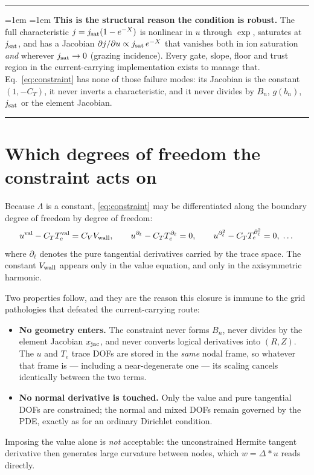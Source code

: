\documentclass[11pt,a4paper]{article}
\newenvironment{keybox}{\par\medskip\noindent\rule{\linewidth}{0.4pt}\par\smallskip%
\leftskip=1em \rightskip=1em\relax}{\par\smallskip\leftskip=0pt \rightskip=0pt\noindent\rule{\linewidth}{0.4pt}\par\medskip}
\begin{document}
\begin{keybox}
\textbf{This is the structural reason the condition is robust.} The full characteristic
$j=j_{\rm sat}(1-e^{-X})$ is nonlinear in $u$ through $\exp$, saturates at $j_{\rm sat}$, and has a
Jacobian $\partial j/\partial u\propto j_{\rm sat}\,e^{-X}$ that vanishes both in ion saturation
\emph{and} wherever $j_{\rm sat}\to0$ (grazing incidence). Every gate, slope, floor and trust region
in the current-carrying implementation exists to manage that. Eq.~\eqref{eq:constraint} has none of
those failure modes: its Jacobian is the constant $(1,-C_T)$, it never inverts a characteristic, and
it never divides by $B_n$, $g(b_n)$, $j_{\rm sat}$ or the element Jacobian.
\end{keybox}

\section{Which degrees of freedom the constraint acts on}

Because $\Lambda$ is a constant, \eqref{eq:constraint} may be differentiated along the boundary
degree of freedom by degree of freedom:
\begin{equation}
  u^{\rm val}-C_TT_e^{\rm val}=C_VV_{\rm wall},
  \qquad
  u^{\partial_\ell}-C_TT_e^{\partial_\ell}=0,
  \qquad
  u^{\partial_\ell^2}-C_TT_e^{\partial_\ell^2}=0,\;\dots
\end{equation}
where $\partial_\ell$ denotes the pure tangential derivatives carried by the trace space. The
constant $V_{\rm wall}$ appears only in the value equation, and only in the axisymmetric harmonic.

Two properties follow, and they are the reason this closure is immune to the grid pathologies that
defeated the current-carrying route:
\begin{itemize}\itemsep2pt
\item \textbf{No geometry enters.} The constraint never forms $B_n$, never divides by the element
      Jacobian $x_{\rm jac}$, and never converts logical derivatives into $(R,Z)$. The $u$ and
      $T_e$ trace DOFs are stored in the \emph{same} nodal frame, so whatever that frame is ---
      including a near-degenerate one --- its scaling cancels identically between the two terms.
\item \textbf{No normal derivative is touched.} Only the value and pure tangential DOFs are
      constrained; the normal and mixed DOFs remain governed by the PDE, exactly as for an ordinary
      Dirichlet condition.
\end{itemize}
Imposing the value alone is \emph{not} acceptable: the unconstrained Hermite tangent derivative then
generates large curvature between nodes, which $w=\Delta^\!*u$ reads directly.
\end{document}
